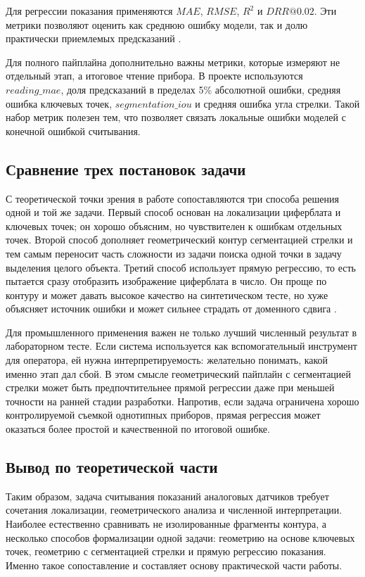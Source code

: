 \documentclass[a4paper,14pt]{extarticle}
\begin{document}
Для регрессии показания применяются $MAE$, $RMSE$, $R^2$ и $DRR@0.02$. Эти метрики позволяют оценить как среднюю ошибку модели, так и долю практически приемлемых предсказаний \cite{meterRegression2024,sciRep2025}.

Для полного пайплайна дополнительно важны метрики, которые измеряют не отдельный этап, а итоговое чтение прибора. В проекте используются $reading\_mae$, доля предсказаний в пределах 5\% абсолютной ошибки, средняя ошибка ключевых точек, $segmentation\_iou$ и средняя ошибка угла стрелки. Такой набор метрик полезен тем, что позволяет связать локальные ошибки моделей с конечной ошибкой считывания.

	\subsection{Сравнение трех постановок задачи}

С теоретической точки зрения в работе сопоставляются три способа решения одной и той же задачи. Первый способ основан на локализации циферблата и ключевых точек; он хорошо объясним, но чувствителен к ошибкам отдельных точек. Второй способ дополняет геометрический контур сегментацией стрелки и тем самым переносит часть сложности из задачи поиска одной точки в задачу выделения целого объекта. Третий способ использует прямую регрессию, то есть пытается сразу отобразить изображение циферблата в число. Он проще по контуру и может давать высокое качество на синтетическом тесте, но хуже объясняет источник ошибки и может сильнее страдать от доменного сдвига \cite{howells2021,reitsma2024,meterRegression2024,sciRep2025}.

Для промышленного применения важен не только лучший численный результат в лабораторном тесте. Если система используется как вспомогательный инструмент для оператора, ей нужна интерпретируемость: желательно понимать, какой именно этап дал сбой. В этом смысле геометрический пайплайн с сегментацией стрелки может быть предпочтительнее прямой регрессии даже при меньшей точности на ранней стадии разработки. Напротив, если задача ограничена хорошо контролируемой съемкой однотипных приборов, прямая регрессия может оказаться более простой и качественной по итоговой ошибке.

	\subsection{Вывод по теоретической части}

		Таким образом, задача считывания показаний аналоговых датчиков требует сочетания локализации, геометрического анализа и численной интерпретации. Наиболее естественно сравнивать не изолированные фрагменты контура, а несколько способов формализации одной задачи: геометрию на основе ключевых точек, геометрию с сегментацией стрелки и прямую регрессию показания. Именно такое сопоставление и составляет основу практической части работы.
\end{document}
